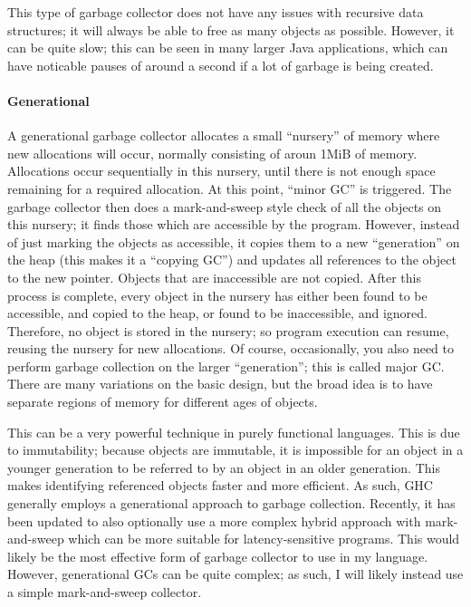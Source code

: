 \documentclass[9pt]{extarticle}
\begin{document}
This type of garbage collector does not have any issues with recursive
data structures; it will always be able to free as many objects as
possible. However, it can be quite slow; this can be seen in many larger
Java applications, which can have noticable pauses of around a second if
a lot of garbage is being created.

\paragraph{Generational}

A generational garbage collector allocates a small ``nursery'' of memory
where new allocations will occur, normally consisting of aroun 1MiB of
memory. Allocations occur sequentially in this nursery, until there is
not enough space remaining for a required allocation. At this point,
``minor GC'' is triggered. The garbage collector then does a
mark-and-sweep style check of all the objects on this nursery; it finds
those which are accessible by the program. However, instead of just
marking the objects as accessible, it copies them to a new
``generation'' on the heap (this makes it a ``copying GC'') and updates
all references to the object to the new pointer. Objects that are
inaccessible are not copied. After this process is complete, every
object in the nursery has either been found to be accessible, and copied
to the heap, or found to be inaccessible, and ignored. Therefore, no
object is stored in the nursery; so program execution can resume,
reusing the nursery for new allocations. Of course, occasionally, you
also need to perform garbage collection on the larger ``generation'';
this is called major GC. There are many variations on the basic design,
but the broad idea is to have separate regions of memory for different
ages of objects.

This can be a very powerful technique in purely functional languages.
This is due to immutability; because objects are immutable, it is
impossible for an object in a younger generation to be referred to by an
object in an older generation. This makes identifying referenced objects
faster and more efficient. As such, GHC generally employs a generational
approach to garbage collection. Recently, it has been updated to also
optionally use a more complex hybrid approach with mark-and-sweep which
can be more suitable for latency-sensitive programs. This would likely
be the most effective form of garbage collector to use in my language.
However, generational GCs can be quite complex; as such, I will likely
instead use a simple mark-and-sweep collector.
\end{document}
